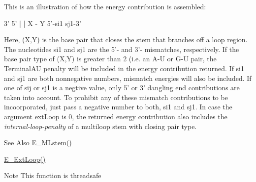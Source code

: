 This is an illustration of how the energy contribution is assembled\-: 
\begin{DoxyPre}
      3'  5'
      |   |
      X - Y
5'-si1     sj1-3'
\end{DoxyPre}


Here, (X,Y) is the base pair that closes the stem that branches off a loop region. The nucleotides si1 and sj1 are the 5'-\/ and 3'-\/ mismatches, respectively. If the base pair type of (X,Y) is greater than 2 (i.\-e. an A-\/\-U or G-\/\-U pair, the Terminal\-A\-U penalty will be included in the energy contribution returned. If si1 and sj1 are both nonnegative numbers, mismatch energies will also be included. If one of sij or sj1 is a negtive value, only 5' or 3' dangling end contributions are taken into account. To prohibit any of these mismatch contributions to be incoorporated, just pass a negative number to both, si1 and sj1. In case the argument ext\-Loop is 0, the returned energy contribution also includes the {\itshape internal-\/loop-\/penalty} of a multiloop stem with closing pair type.

\begin{DoxySeeAlso}{See Also}
E\-\_\-\-M\-Lstem() 

\hyperlink{group__loops_ga05c6288c5a79d3bd5ad6d33c1bb34bd0}{E\-\_\-\-Ext\-Loop()} 
\end{DoxySeeAlso}
\begin{DoxyNote}{Note}
This function is threadsafe
\end{DoxyNote}

